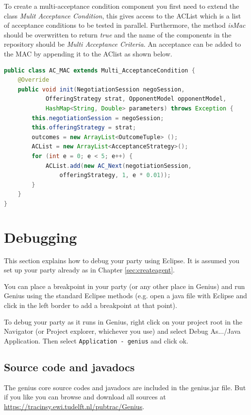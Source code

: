 \documentclass[]{article}
\newcommand\Genius{{\sc Genius}}
\begin{document}
To create a multi-acceptance condition component you first need to extend the class \textit{Mulit Acceptance Condition}, this gives access to the ACList which is a list of acceptance conditions to be tested in parallel. Furthermore, the method \textit{isMac} should be overwritten to return \textit{true} and the name of the components in the repository should be \textit{Multi Acceptance Criteria}. An acceptance can be added to the MAC by appending it to the AClist as shown below. 

\begin{lstlisting}[language=Java, caption={Example code for Acceptance condition}]
public class AC_MAC extends Multi_AcceptanceCondition {
	@Override
	public void init(NegotiationSession negoSession, 
			OfferingStrategy strat, OpponentModel opponentModel, 
			HashMap<String, Double> parameters) throws Exception {
		this.negotiationSession = negoSession;
		this.offeringStrategy = strat;
		outcomes = new ArrayList<OutcomeTuple> ();
		ACList = new ArrayList<AcceptanceStrategy>();
		for (int e = 0; e < 5; e++) {
			ACList.add(new AC_Next(negotiationSession, 
				offeringStrategy, 1, e * 0.01));
		}
	}
}
\end{lstlisting}





\section{Debugging}\label{sec:debugging}
This section explains how to debug your party using Eclipse. It is assumed you set up your party already as in Chapter \ref{sec:createagent}.

You can place a breakpoint in your party (or any other place in {\Genius}) and run {\Genius} using the standard Eclipse methods (e.g. open a java file with Eclipse and click in the left border to add a breakpoint at that point).

To debug your party as it runs in Genius, right click on your project root in the Navigator (or Project explorer, whichever you use) and select Debug As.../Java Application. Then select \verb|Application - genius| and click ok.


\subsection{Source code and javadocs}
The genius core source codes and javadocs are included in the genius.jar file. But if you like you can browse and download all sources at \url{https://tracinsy.ewi.tudelft.nl/pubtrac/Genius}.
\end{document}
